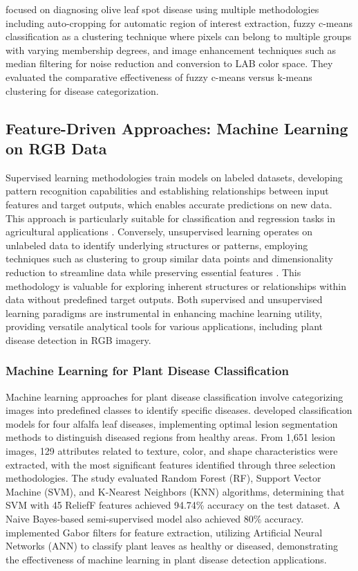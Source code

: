 \documentclass[sn-mathphys]{sn-jnl}
\theoremstyle{thmstyleone}%
\theoremstyle{thmstyletwo}%
\theoremstyle{thmstylethree}%
\begin{document}
\citet{al2013empirical} focused on diagnosing olive leaf spot disease using multiple methodologies including auto-cropping for automatic region of interest extraction, fuzzy c-means classification as a clustering technique where pixels can belong to multiple groups with varying membership degrees, and image enhancement techniques such as median filtering for noise reduction and conversion to LAB color space. They evaluated the comparative effectiveness of fuzzy c-means versus k-means clustering for disease categorization.



\subsection{Feature-Driven Approaches: Machine Learning on RGB Data}

Supervised learning methodologies train models on labeled datasets, developing pattern recognition capabilities and establishing relationships between input features and target outputs, which enables accurate predictions on new data. This approach is particularly suitable for classification and regression tasks in agricultural applications \citep{kotsiantis2007supervised}. Conversely, unsupervised learning operates on unlabeled data to identify underlying structures or patterns, employing techniques such as clustering to group similar data points and dimensionality reduction to streamline data while preserving essential features \citep{usama2019unsupervised}. This methodology is valuable for exploring inherent structures or relationships within data without predefined target outputs. Both supervised and unsupervised learning paradigms are instrumental in enhancing machine learning utility, providing versatile analytical tools for various applications, including plant disease detection in RGB imagery.

\subsubsection{Machine Learning for Plant Disease Classification}

Machine learning approaches for plant disease classification involve categorizing images into predefined classes to identify specific diseases. \citet{qin2016identification} developed classification models for four alfalfa leaf diseases, implementing optimal lesion segmentation methods to distinguish diseased regions from healthy areas. From 1,651 lesion images, 129 attributes related to texture, color, and shape characteristics were extracted, with the most significant features identified through three selection methodologies. The study evaluated Random Forest (RF), Support Vector Machine (SVM), and K-Nearest Neighbors (KNN) algorithms, determining that SVM with 45 ReliefF features achieved 94.74\% accuracy on the test dataset. A Naive Bayes-based semi-supervised model also achieved 80\% accuracy. \citet{kulkarni2012applying} implemented Gabor filters for feature extraction, utilizing Artificial Neural Networks (ANN) to classify plant leaves as healthy or diseased, demonstrating the effectiveness of machine learning in plant disease detection applications.
\end{document}
